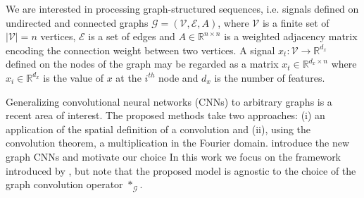 \documentclass{article} %
\newcommand{\R}{\mathbb{R}}
\newcommand{\G}{\mathcal{G}}
\newcommand{\V}{\mathcal{V}}
\newcommand{\E}{\mathcal{E}}
\newcommand{\todo}[1]{{\color{red} #1 }}
\begin{document}
We are interested in processing graph-structured sequences, i.e. signals
defined on undirected and connected graphs $\G=(\V,\E,A)$, where $\V$ is a
finite set of $|\V|=n$ vertices, $\E$ is a set of edges and $A \in \R^{n \times
n}$ is a weighted adjacency matrix encoding the connection weight between two
vertices. A signal $x_t: \V \rightarrow \R^{d_x}$ defined on the nodes of the
graph may be regarded as a matrix $x_t \in \R^{d_x \times n}$ where $x_i \in
\R^{d_x}$ is the value of $x$ at the $i^{th}$ node and $d_x$ is the number of
features.

Generalizing convolutional neural networks (CNNs) to arbitrary graphs is a
recent area of interest. The proposed methods take two approaches: (i) an
application of the spatial definition of a convolution and (ii), using the
convolution theorem, a multiplication in the Fourier domain.
\todo{introduce the new graph CNNs and motivate our choice}
In this work we focus on the framework introduced by \citet{graphcnn}, but note
that the proposed model is agnostic to the choice of the graph convolution
operator $\ast_\G$.
\end{document}

